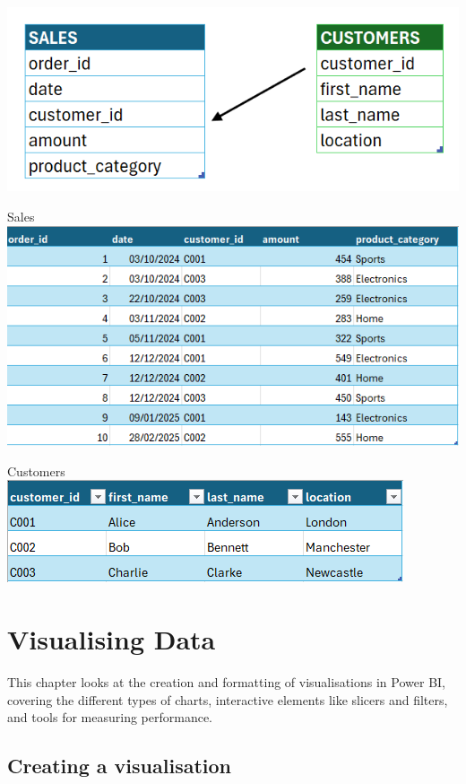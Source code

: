 \documentclass[10pt, openany, twocolumn]{book}
\begin{document}
\begin{center}
    \includegraphics[width=0.6\columnwidth]{images/dummydata.png}
\end{center}
\vspace{4ex}
\begin{center}
    {\Large Sales}\\
    \vspace{3ex}
    \includegraphics[width=0.75\columnwidth]{images/salestable.png}
\end{center}
\vspace{4ex}
\begin{center}
    {\Large Customers}\\
    \vspace{3ex}
    \includegraphics[width=0.55\columnwidth]{images/customerstable.png}
\end{center}
\twocolumn

\chapter{Visualising Data}  

This chapter looks at the creation and formatting of visualisations in Power BI, covering the different types of charts, interactive elements like slicers and filters, and tools for measuring performance.

\section{Creating a visualisation}
\end{document}
